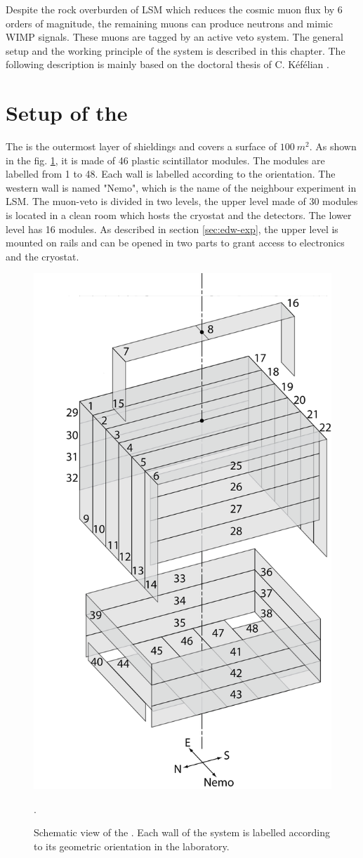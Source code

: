 Despite the rock overburden of LSM which reduces the cosmic muon flux by 6 orders of magnitude, the remaining muons can produce neutrons and mimic WIMP signals. These muons are tagged by an active veto system. The general setup and the working principle of the system is described in this chapter. The following description is mainly based on the doctoral thesis of C. K{\'{e}}f{\'{e}}lian \cite{Kef16}.



\section{Setup of the \mvs}
\label{sec:muon-setup}

The \mvs{} is the outermost layer of shieldings and covers a surface of $\SI{100}{m^{2}}$. As shown in the fig. \ref{fig:muon-setup}, it is made of 46 plastic scintillator modules. The modules are labelled from 1 to 48. Each wall is labelled according to the orientation. The western wall is named "Nemo", which is the name of the neighbour experiment in LSM.
The muon-veto is divided in two levels, the upper level made of 30 modules is located in a clean room which hosts the cryostat and the detectors. The lower level has 16 modules. As described in section \ref{sec:edw-exp}, the upper level is mounted on rails and can be opened in two parts to grant access to electronics and the cryostat.

\begin{figure}[ht!]
  \centering
  \includegraphics[width=0.5\textwidth{}]{./fig/Veto.png}
  \caption{Schematic view of the \mvs. Each wall of the system is labelled according to its geometric orientation in the laboratory. }.
  \label{fig:muon-setup}
\end{figure}


